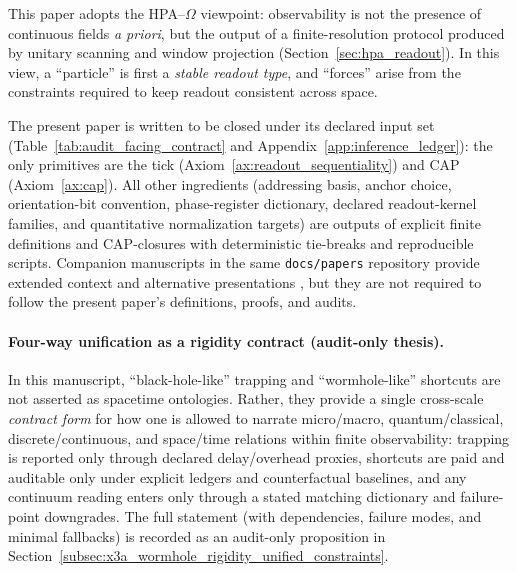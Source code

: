 This paper adopts the HPA--$\Omega$ viewpoint: observability is not the presence of continuous fields \emph{a priori}, but the output of a finite-resolution protocol produced by unitary scanning and window projection (Section~\ref{sec:hpa_readout}).
In this view, a ``particle'' is first a \emph{stable readout type}, and ``forces'' arise from the constraints required to keep readout consistent across space.

The present paper is written to be closed under its declared input set (Table~\ref{tab:audit_facing_contract} and Appendix~\ref{app:inference_ledger}): the only primitives are the tick (Axiom~\ref{ax:readout_sequentiality}) and CAP (Axiom~\ref{ax:cap}).
All other ingredients (addressing basis, anchor choice, orientation-bit convention, phase-register dictionary, declared readout-kernel families, and quantitative normalization targets) are outputs of explicit finite definitions and CAP-closures with deterministic tie-breaks and reproducible scripts.
Companion manuscripts in the same \texttt{docs/papers} repository provide extended context and alternative presentations \cite{Ma2025HPA,Ma2025CAP,Ma2025CAPII,Ma2025HHU,Ma2025HPT,Ma2025PCG,Ma2025RF,Ma2025HPOT,Ma2025FoP}, but they are not required to follow the present paper's definitions, proofs, and audits.

\paragraph{Four-way unification as a rigidity contract (audit-only thesis).}
\AuditTag In this manuscript, ``black-hole-like'' trapping and ``wormhole-like'' shortcuts are not asserted as spacetime ontologies.
Rather, they provide a single cross-scale \emph{contract form} for how one is allowed to narrate micro/macro, quantum/classical, discrete/continuous, and space/time relations within finite observability:
trapping is reported only through declared delay/overhead proxies, shortcuts are paid and auditable only under explicit ledgers and counterfactual baselines,
and any continuum reading enters only through a stated matching dictionary and failure-point downgrades.
The full statement (with dependencies, failure modes, and minimal fallbacks) is recorded as an audit-only proposition in
Section~\ref{subsec:x3a_wormhole_rigidity_unified_constraints}.

